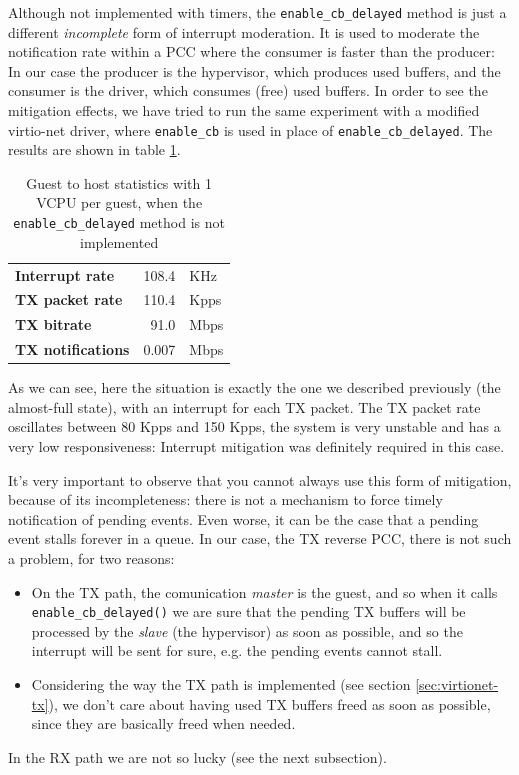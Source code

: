 Although not implemented with timers, the \texttt{enable\_cb\_delayed} method is just a different \emph{incomplete} form of interrupt 
moderation.
It is used to moderate the notification rate within a PCC where the consumer is faster than the producer: In our case
the producer is the hypervisor, which produces used buffers, and the consumer is the driver, which consumes (free) used buffers.
In order to see the mitigation effects, we have tried to run the same experiment with a modified virtio-net driver, where \texttt{enable\_cb}
is used in place of \texttt{enable\_cb\_delayed}. The results are shown in table \ref{tab:virtionet-tx-nomit-g2h1vcpu}.

\begin{table}
\begin{center}
\begin{tabular}{lrl}
\toprule
\textbf{Interrupt rate} & 108.4 & KHz\\
\textbf{TX packet rate} & 110.4 & Kpps\\
\textbf{TX bitrate} & 91.0 & Mbps\\
\textbf{TX notifications} & 0.007 & Mbps\\
\bottomrule
\end{tabular}
\end{center}
\caption{Guest to host statistics with 1 VCPU per guest, when the \texttt{enable\_cb\_delayed} method is not implemented}
\label{tab:virtionet-tx-nomit-g2h1vcpu}
\end{table}

As we can see, here the situation is exactly the one we described previously (the almost-full state), with an interrupt for each TX packet.
The TX packet rate oscillates between 80 Kpps and 150 Kpps, the system is very unstable and has a very low responsiveness: Interrupt
mitigation was definitely required in this case.

\vspace{0.5cm}

It's very important to observe that you cannot always use this form of mitigation, because of its incompleteness: there is not a 
mechanism to force timely notification of pending events. Even worse, it can be the case that a pending event stalls forever in a 
queue.
In our case, the TX reverse PCC, there is not such a problem, for two reasons:
\begin{itemize}
  \item On the TX path, the comunication \emph{master} is the guest, and so when it calls \texttt{enable\_cb\_delayed()} we are sure
	that the pending TX buffers will be processed by the \emph{slave} (the hypervisor) as soon as possible, and so the interrupt
	will be sent for sure, e.g. the pending events cannot stall.
	
  \item Considering the way the TX path is implemented (see section \ref{sec:virtionet-tx}), we don't care about having used TX buffers
	freed as soon as possible, since they are basically freed when needed.
\end{itemize}
In the RX path we are not so lucky (see the next subsection).

